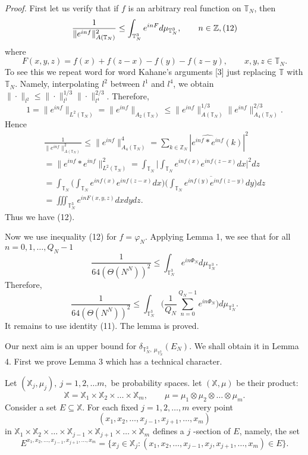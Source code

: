 \documentclass[12pt]{article}
\begin{document}
\emph{Proof.} First let us verify that if $f$ is an arbitrary real
function on $\mathbb T_N$, then
$$
\frac{1}{\|e^{inf}\|_{A(\mathbb T_N)}^2}\leq
\int_{\mathbb T_N^3} e^{inF} d\mu_{\mathbb T_N^3},
\qquad n\in\mathbb Z,
\relax(12)
$$
where
$$
F(x, y, z)=f(x)+f(z-x)-f(y)-f(z-y),
\qquad x, y, z\in \mathbb T_N.
$$
To see this we repeat word for word Kahane's arguments [3] just
replacing $\mathbb T$ with $\mathbb T_N$. Namely, interpolating
$l^2$ between $l^1$ and $l^4$, we obtain $\|\cdot\|_{l^2}\leq
\|\cdot\|_{l^1}^{1/3}\|\cdot\|_{l^4}^{2/3}$. Therefore,
$$
1=\|e^{inf}\|_{L^2(\mathbb T_N)}=\|e^{inf}\|_{A_2(\mathbb T_N)}
\leq\|e^{inf}\|_{A(\mathbb T_N)}^{1/3}
\|e^{inf}\|_{A_4(\mathbb T_N)}^{2/3}.
$$
Hence
\begin{multline*}
\frac{1}{\|e^{inf}\|_{A(\mathbb T_N)}^2}\leq
\|e^{inf}\|_{A_4(\mathbb T_N)}^4= \sum_{k\in \mathbb
Z_N}|\widehat{e^{inf}\ast e^{inf}}(k)|^2\\= \|e^{inf}\ast
e^{inf}\|_{L^2(\mathbb T_N)}^2= \int_{\mathbb T_N}
\bigg|\int_{\mathbb T_N} e^{inf(x)}e^{inf(z-x)} dx\bigg|^2 dz
\\ = \int_{\mathbb T_N}\bigg(\int_{\mathbb T_N}
e^{inf(x)}e^{inf(z-x)} dx\bigg)\overline{\bigg(\int_{\mathbb T_N}
e^{inf(y)}e^{inf(z-y)} dy\bigg)} dz \\ = \iiint_{\mathbb T_N^3}
e^{inF(x, y, z)} dx dy dz.
\end{multline*}
Thus we have (12).

    Now we use inequality (12) for
$f=\varphi_N$. Applying Lemma 1, we see that for all $n=0, 1,
\ldots, Q_N-1$
$$
\frac{1}{64(\Theta(N^N))^2}\leq
\int_{\mathbb T_N^3}e^{in\Phi_N} d\mu_{\mathbb T_N^3}.
$$
Therefore,
$$
\frac{1}{64(\Theta(N^N))^2}\leq
\int_{\mathbb T_N^3}\bigg(\frac{1}{Q_N}
\sum_{n=0}^{Q_N-1}e^{in\Phi_N}\bigg)
d\mu_{\mathbb T_N^3}.
$$
It remains to use identity (11). The lemma is proved.

\quad

   Our next aim is an upper bound for
$\delta_{\mathbb T_N^3, ~\mu_{\mathbb T_N^3}}(E_N)$. We shall
obtain it in Lemma 4. First we prove Lemma 3 which has a technical
character.

   Let $(\mathbb X_j, \mu_j), ~j=1, 2, \ldots m,$ be probability
spaces. let $(\mathbb X, \mu)$ be their product:
$$
\mathbb X=\mathbb X_1\times\mathbb X_2\times\ldots\times\mathbb X_m,
\qquad\mu=\mu_1\otimes\mu_2\otimes\ldots\otimes\mu_m.
$$
Consider a set $E\subseteq\mathbb X$. For each fixed $j=1, 2,
\ldots, m$ every point
$$
(x_1, x_2, \ldots, x_{j-1}, x_{j+1}, \ldots, x_m)
$$
in $\mathbb X_1\times\mathbb X_2\times\ldots \times\mathbb
X_{j-1}\times\mathbb X_{j+1}\times \ldots \times\mathbb X_m$
defines a $j$ -section of $E$, namely, the set
$$
E^{x_1, x_2,
\ldots, x_{j-1}, x_{j+1}, \ldots, x_m}=\{x_j\in\mathbb X_j :
(x_1, x_2, \ldots, x_{j-1}, x_j, x_{j+1}, \ldots, x_m)\in E\}.
$$
\end{document}
